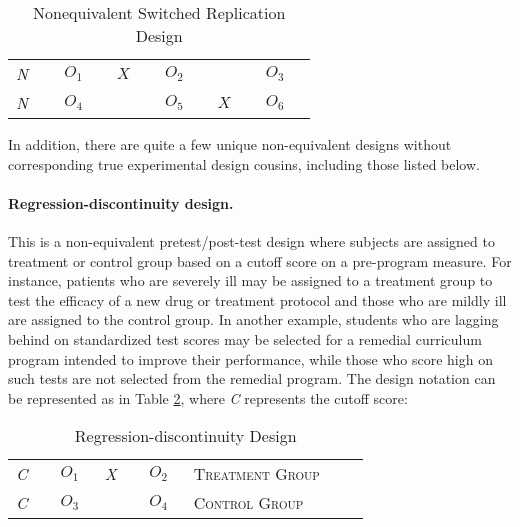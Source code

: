 \begin{table}[H]
	\centering
	\begin{tabularx}{0.75\linewidth}{p{0.10\linewidth}p{0.10\linewidth}p{0.10\linewidth}p{0.10\linewidth}p{0.10\linewidth}p{0.10\linewidth}}
		\toprule
		\textit{N} & $ O_1 $ & $ X $ & $ O_2 $ &       & $ O_3 $ \\
		\textit{N} & $ O_4 $ &       & $ O_5 $ & $ X $ & $ O_6 $ \\
		\bottomrule
	\end{tabularx}
	\caption{Nonequivalent Switched Replication Design}
	\label{09:tab09}
\end{table}

In addition, there are quite a few unique non-equivalent designs without corresponding true experimental design cousins, including those listed below.

\paragraph{Regression-discontinuity design.} This is a non-equivalent pretest/post-test design where subjects are assigned to treatment or control group based on a cutoff score on a pre-program measure. For instance, patients who are severely ill may be assigned to a treatment group to test the efficacy of a new drug or treatment protocol and those who are mildly ill are assigned to the control group. In another example, students who are lagging behind on standardized test scores may be selected for a remedial curriculum program intended to improve their performance, while those who score high on such tests are not selected from the remedial program. The design notation can be represented as in Table \ref{09:tab10}, where \textit{C} represents the cutoff score:

\begin{table}[H]
	\centering
	\begin{tabularx}{0.85\linewidth}{p{0.10\linewidth}p{0.10\linewidth}p{0.10\linewidth}p{0.10\linewidth}p{0.40\linewidth}}
		\toprule
		\textit{C} & $ O_1 $ & \textit{X} & $ O_2 $ & \textsc{Treatment Group} \\
		\textit{C} & $ O_3 $ &            & $ O_4 $ & \textsc{Control Group} \\
		\bottomrule
	\end{tabularx}
	\caption{Regression-discontinuity Design}
	\label{09:tab10}
\end{table}

